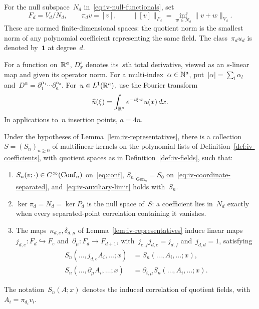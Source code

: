 \begin{definition}\label{def:iv-fields}
For the null subspace~$N_d$ in~\eqref{eq:iv-null-functionals}, set
\begin{equation}\label{eq:iv-fields}
 F_d=V_d/N_d,\qquad \pi_dv=[v],\qquad
 \|[v]\|_{F_d}=\inf_{w\in N_d}\|v+w\|_{V_d}.
\end{equation}
These are normed finite-dimensional spaces: the quotient norm is the smallest norm of any polynomial coefficient representing the same field.
The class~$\pi_du_d$ is denoted by~$\mathbf1$ at degree~$d$.
\end{definition}

\begin{definition}\label{def:iv-analysis}
For a function on~$\mathbb R^a$, $D_x^s$ denotes its~$s$th total derivative, viewed as an $s$-linear map and given its operator norm.
For a multi-index~$\alpha\in\mathbb N^a$, put~$|\alpha|=\sum_l\alpha_l$ and~$D^\alpha=\partial_1^{\alpha_1}\cdots\partial_a^{\alpha_a}$.
For~$u\in L^1(\mathbb R^a)$, use the Fourier transform
\begin{equation*}
 \widehat u(\xi)=\int_{\mathbb R^a}e^{-i\xi\cdot x}u(x)\,dx.
\end{equation*}
In applications to~$n$ insertion points, $a=4n$.
\end{definition}

\begin{proposition}\label{prop:iv-smooth}
Under the hypotheses of Lemma~\ref{lem:iv-representatives}, there is a collection~$S=(S_n)_{n\ge0}$ of multilinear kernels on the polynomial lists of Definition~\ref{def:iv-coefficients}, with quotient spaces as in Definition~\ref{def:iv-fields}, such that:
\begin{enumerate}[label=\textup{(\roman*)},ref=\theproposition(\roman*)]
\item\label{item:iv-smooth-limits} $S_n(v;\cdot)\in C^\infty(\operatorname{Conf}_{n})$ on~\eqref{eq:conf},
$S_n|_{\operatorname{Gen}_n}=S_0$ on~\eqref{eq:iv-coordinate-separated}, and~\eqref{eq:iv-auxiliary-limit} holds with~$S_n$.
\item\label{item:iv-smooth-null} $\ker\pi_d=N_d=\ker P_d$ is the null space of~$S$: a coefficient lies in~$N_d$ exactly when every separated-point correlation containing it vanishes.
\item\label{item:iv-smooth-operations} The maps~$\kappa_{d,e},\delta_{d,\mu}$ of Lemma~\ref{lem:iv-representatives} induce linear maps~$j_{d,e}:F_d\hookrightarrow F_e$ and~$\partial_\mu:F_d\to F_{d+1}$, with~$j_{e,f}j_{d,e}=j_{d,f}$ and~$j_{d,d}=1$, satisfying
\begin{equation}\label{eq:iv-field-derivative}
\begin{aligned}
 S_n(\ldots,j_{d,e}A_i,\ldots;x)&=S_n(\ldots,A_i,\ldots;x),\\
 S_n(\ldots,\partial_\mu A_i,\ldots;x)&=\partial_{i,\mu}S_n(\ldots,A_i,\ldots;x).
\end{aligned}
\end{equation}
\end{enumerate}
The notation~$S_n(A;x)$ denotes the induced correlation of quotient fields, with~$A_i=\pi_{d_i}v_i$.
\end{proposition}

